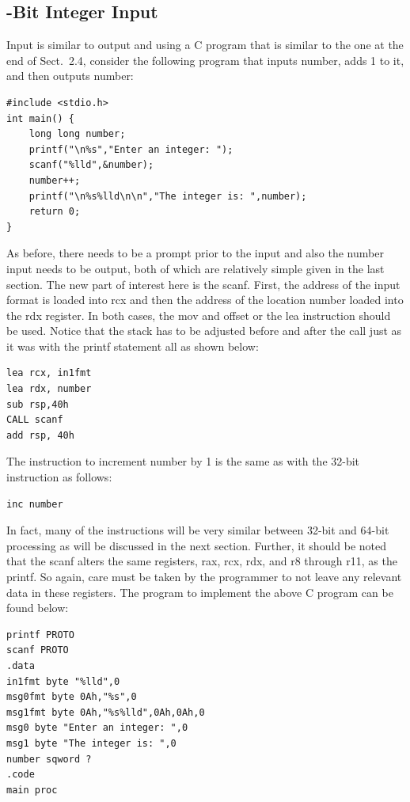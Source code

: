 \documentclass[10pt]{book}
\begin{document}
\subsection{-Bit Integer Input}
Input is similar to output and using a C program that is similar to the one at the end of Sect.~2.4, consider the following program that inputs number, adds 1 to it, and then outputs number:
\begin{verbatim}
#include <stdio.h>
int main() {
    long long number;
    printf("\n%s","Enter an integer: ");
    scanf("%lld",&number);
    number++;
    printf("\n%s%lld\n\n","The integer is: ",number);
    return 0;
}
\end{verbatim}

As before, there needs to be a prompt prior to the input and also the number input needs to be output, both of which are relatively simple given in the last section. The new part of interest here is the scanf. First, the address of the input format is loaded into rcx and then the address of the location number loaded into the rdx register. In both cases, the mov and offset or the lea instruction should be used. Notice that the stack has to be adjusted before and after the call just as it was with the printf statement all as shown below:
\begin{verbatim}
lea rcx, in1fmt
lea rdx, number
sub rsp,40h
CALL scanf
add rsp, 40h
\end{verbatim}

The instruction to increment number by 1 is the same as with the 32-bit instruction as follows:

\begin{verbatim}
inc number
\end{verbatim}

In fact, many of the instructions will be very similar between 32-bit and 64-bit processing as will be discussed in the next section. Further, it should be noted that the scanf alters the same registers, rax, rcx, rdx, and r8 through r11, as the printf. So again, care must be taken by the programmer to not leave any relevant data in these registers. The program to implement the above C program can be found below:

\begin{verbatim}
printf PROTO
scanf PROTO
.data
in1fmt byte "%lld",0
msg0fmt byte 0Ah,"%s",0
msg1fmt byte 0Ah,"%s%lld",0Ah,0Ah,0
msg0 byte "Enter an integer: ",0
msg1 byte "The integer is: ",0
number sqword ?
.code
main proc
\end{verbatim}
\end{document}
